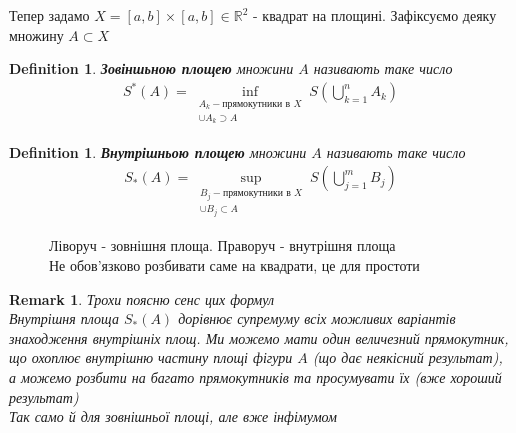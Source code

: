 \documentclass[a4paper, 14pt]{extarticle}
\theoremstyle{theoremdd}
\theoremstyle{theoremdd}
\newtheorem{definition}[theorem]{Definition}
\theoremstyle{theoremdd}
\theoremstyle{theoremdd}
\theoremstyle{theoremdd}
\theoremstyle{theoremdd}
\newtheorem{remark}[theorem]{Remark}
\theoremstyle{theoremdd}
\theoremstyle{theoremdd}
\begin{document}
Тепер задамо $X = [a,b] \times [a,b] \in \mathbb{R}^2$ - квадрат на площині. Зафіксуємо деяку множину $A \subset X$
\begin{definition}
\textbf{Зовіншьною площею} множини $A$ називають таке число
\begin{align*}
S^*(A) = \inf_{\substack{A_k - \text{прямокутники в } X \\ \cup A_k \supset A}} S\left(\bigcup_{k=1}^n A_k \right)
\end{align*}
\end{definition}

\begin{definition}
\textbf{Внутрішньою площею} множини $A$ називають таке число
\begin{align*}
S_*(A) = \sup_{\substack{B_j - \text{прямокутники в } X \\ \cup B_j \subset A}} S\left(\bigcup_{j=1}^m B_j \right)
\end{align*}
\end{definition}

\begin{figure}[H]
\centering
{}
\qquad
{}

\caption*{Ліворуч - зовнішня площа. Праворуч - внутрішня площа \\ 
Не обов'язково розбивати саме на квадрати, це для простоти}
\end{figure}

\begin{remark}
Трохи поясню сенс цих формул\\
Внутрішня площа $S_*(A)$ дорівнює супремуму всіх можливих варіантів знаходження внутрішніх площ. Ми можемо мати один величезний прямокутник, що охоплює внутрішню частину площі фігури $A$ (що дає неякісний результат), а можемо розбити на багато прямокутників та просумувати їх (вже хороший результат)\\
Так само й для зовнішньої площі, але вже інфімумом
\end{remark}
\end{document}
